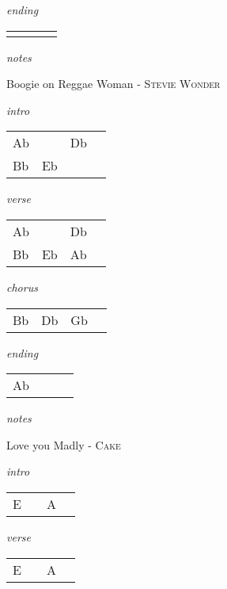 \documentclass[12pt]{article}
\begin{document}
\textit{ending}

\begin{tabular}{|P{1.25in}|P{1.25in}|P{1.25in}|P{1.25in}|}
    &   &   &   \\
\end{tabular}

\textit{notes}

\newpage

{\Huge Boogie on Reggae Woman} {\huge - \textsc{Stevie Wonder}}

\huge
\textit{intro}

\begin{tabular}{|P{1.25in}|P{1.25in}|P{1.25in}|P{1.25in}|}
  Ab &     & Db  &   \\
  Bb & Eb  &
\end{tabular}

\textit{verse}

\begin{tabular}{|P{1.25in}|P{1.25in}|P{1.25in}|P{1.25in}|}
  Ab &   &  Db &   \\
  Bb  & Eb  & Ab &  \\
\end{tabular}

\textit{chorus}

\begin{tabular}{|P{1.25in}|P{1.25in}|P{1.25in}|P{1.25in}|}
  Bb & Db  & Gb  &   \\
\end{tabular}

\textit{ending}

\begin{tabular}{|P{1.25in}|P{1.25in}|P{1.25in}|P{1.25in}|}
  Ab &   &   &   \\
\end{tabular}

\textit{notes}

\newpage

{\Huge Love you Madly} {\huge - \textsc{Cake}}

\huge
\textit{intro}

\begin{tabular}{|P{1.25in}|P{1.25in}|P{1.25in}|P{1.25in}|}
  E &   & A  &   \\
\end{tabular}

\textit{verse}

\begin{tabular}{|P{1.25in}|P{1.25in}|P{1.25in}|P{1.25in}|}
  E &   & A  &   \\
\end{tabular}
\end{document}
